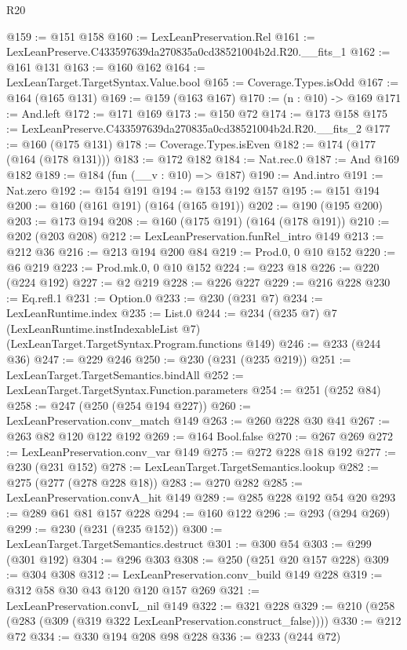 \begin{lexlean}{R20}
\begin{coremodule}
@159 := @151 @158
@160 := LexLeanPreservation.Rel
@161 := LexLeanPreserve.C433597639da270835a0cd38521004b2d.R20.__fits_1
@162 := @161 @131
@163 := @160 @162
@164 := LexLeanTarget.TargetSyntax.Value.bool
@165 := Coverage.Types.isOdd
@167 := @164 (@165 @131)
@169 := @159 (@163 @167)
@170 := (n : @10) -> @169
@171 := And.left
@172 := @171 @169
@173 := @150 @72
@174 := @173 @158
@175 := LexLeanPreserve.C433597639da270835a0cd38521004b2d.R20.__fits_2
@177 := @160 (@175 @131)
@178 := Coverage.Types.isEven
@182 := @174 (@177 (@164 (@178 @131)))
@183 := @172 @182
@184 := Nat.rec.{0}
@187 := And @169 @182
@189 := @184 (fun (__v : @10) => @187)
@190 := And.intro
@191 := Nat.zero
@192 := @154 @191
@194 := @153 @192 @157
@195 := @151 @194
@200 := @160 (@161 @191) (@164 (@165 @191))
@202 := @190 (@195 @200)
@203 := @173 @194
@208 := @160 (@175 @191) (@164 (@178 @191))
@210 := @202 (@203 @208)
@212 := LexLeanPreservation.funRel_intro @149
@213 := @212 @36
@216 := @213 @194 @200 @84
@219 := Prod.{0, 0} @10 @152
@220 := @6 @219
@223 := Prod.mk.{0, 0} @10 @152
@224 := @223 @18
@226 := @220 (@224 @192)
@227 := @2 @219
@228 := @226 @227
@229 := @216 @228
@230 := Eq.refl.{1}
@231 := Option.{0}
@233 := @230 (@231 @7)
@234 := LexLeanRuntime.index
@235 := List.{0}
@244 := @234
    (@235 @7)
    @7
    (LexLeanRuntime.instIndexableList @7)
    (LexLeanTarget.TargetSyntax.Program.functions @149)
@246 := @233 (@244 @36)
@247 := @229 @246
@250 := @230 (@231 (@235 @219))
@251 := LexLeanTarget.TargetSemantics.bindAll
@252 := LexLeanTarget.TargetSyntax.Function.parameters
@254 := @251 (@252 @84)
@258 := @247 (@250 (@254 @194 @227))
@260 := LexLeanPreservation.conv_match @149
@263 := @260 @228 @30 @41
@267 := @263 @82 @120 @122 @192
@269 := @164 Bool.false
@270 := @267 @269
@272 := LexLeanPreservation.conv_var @149
@275 := @272 @228 @18 @192
@277 := @230 (@231 @152)
@278 := LexLeanTarget.TargetSemantics.lookup
@282 := @275 (@277 (@278 @228 @18))
@283 := @270 @282
@285 := LexLeanPreservation.convA_hit @149
@289 := @285 @228 @192 @54 @20
@293 := @289 @61 @81 @157 @228
@294 := @160 @122
@296 := @293 (@294 @269)
@299 := @230 (@231 (@235 @152))
@300 := LexLeanTarget.TargetSemantics.destruct
@301 := @300 @54
@303 := @299 (@301 @192)
@304 := @296 @303
@308 := @250 (@251 @20 @157 @228)
@309 := @304 @308
@312 := LexLeanPreservation.conv_build @149 @228
@319 := @312 @58 @30 @43 @120 @120 @157 @269
@321 := LexLeanPreservation.convL_nil @149
@322 := @321 @228
@329 := @210 (@258 (@283 (@309 (@319 @322 LexLeanPreservation.construct_false))))
@330 := @212 @72
@334 := @330 @194 @208 @98 @228
@336 := @233 (@244 @72)

\end{coremodule}
\end{lexlean}
